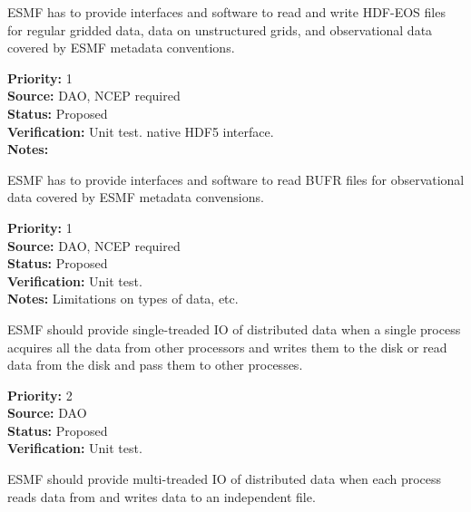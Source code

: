 

ESMF has to provide interfaces and software to read and write HDF-EOS
files for regular gridded data, data on unstructured grids, and observational 
data  covered by ESMF metadata conventions.

\begin{reqlist}
{\bf Priority:} 1 \\
{\bf Source:} DAO, NCEP required \\
{\bf Status:} Proposed \\
{\bf Verification:} Unit test. 
native HDF5 interface. \\
{\bf Notes:}
\end{reqlist}



ESMF has to provide interfaces and software to read BUFR files for
observational data covered by ESMF metadata convensions.

\begin{reqlist}
{\bf Priority:} 1 \\
{\bf Source:} DAO, NCEP required \\
{\bf Status:} Proposed \\
{\bf Verification:} Unit test. \\
{\bf Notes:} Limitations on types of data, etc.
\end{reqlist}





ESMF should provide single-treaded IO of distributed data when a
single process acquires all the data from other processors and writes
them to the disk or read data from the disk and pass them to other processes. 


\begin{reqlist}
{\bf Priority:} 2 \\
{\bf Source:} DAO \\
{\bf Status:} Proposed \\
{\bf Verification:} Unit test.
\end{reqlist}




ESMF should provide multi-treaded IO of distributed data when each
process reads data from and writes data to an independent file. 


